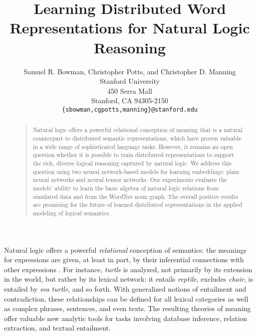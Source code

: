 \documentclass[letterpaper]{article}
\newcommand{\word}[1]{\emph{#1}}
\begin{document}
%
\title{Learning Distributed Word Representations for Natural Logic Reasoning}
\author{Samuel R. Bowman, Christopher Potts, and Christopher D. Manning\\
  Stanford University\\
  450 Serra Mall \\
  Stanford, CA 94305-2150\\
  \texttt{\{sbowman,cgpotts,manning\}@stanford.edu}} %
\maketitle
\begin{abstract}
\begin{quote}
  Natural logic offers a powerful relational conception of meaning
  that is a natural counterpart to distributed semantic
  representations, which have proven valuable in a wide range of
  sophisticated language tasks. However, it remains an open question
  whether it is possible to train distributed representations to
  support the rich, diverse logical reasoning captured by natural
  logic. We address this question using two neural network-based
  models for learning embeddings: plain neural networks and neural
  tensor networks. Our experiments evaluate the models' ability to
  learn the basic algebra of natural logic relations from simulated
  data and from the WordNet noun graph.  The overall positive results
  are promising for the future of learned distributed representations in
  the applied modeling of logical semantics.
\end{quote}
\end{abstract}

Natural logic offers a powerful \emph{relational} conception of
semantics: the meanings for expressions are given, at least in part,
by their inferential connections with other expressions
\cite{vanBenthem08NATLOG,maccartney2009extended}. For instance,
\word{turtle} is analyzed, not primarily by its extension in the
world, but rather by its lexical network: it entails \word{reptile},
excludes \word{chair}, is entailed by \word{sea
  turtle}, and so forth. With generalized notions of entailment and
contradiction, these relationships can be defined for all lexical
categories as well as complex phrases, sentences, and even texts. The
resulting theories of meaning offer valuable new analytic tools for
tasks involving database inference, relation extraction, and textual
entailment.
\end{document}
